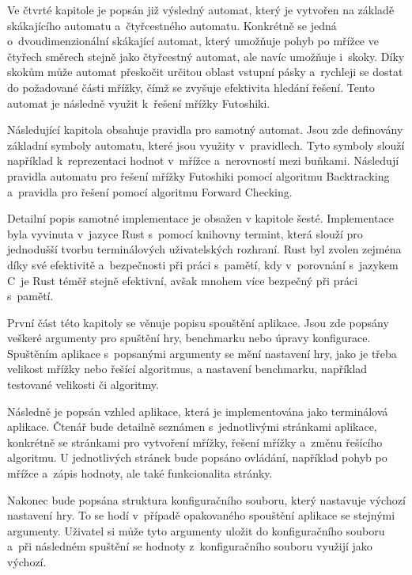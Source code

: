Ve čtvrté kapitole je popsán již výsledný automat, který je vytvořen na základě
skákajícího automatu a~čtyřcestného automatu. Konkrétně se jedná
o~dvoudimenzionální skákající automat, který umožňuje pohyb po mřížce ve
čtyřech směrech stejně jako čtyřcestný automat, ale navíc umožňuje i~skoky.
Díky skokům může automat přeskočit určitou oblast vstupní pásky a~rychleji se
dostat do požadované části mřížky, čímž se zvyšuje efektivita hledání řešení.
Tento automat je následně využit k~řešení mřížky Futoshiki.

Následující kapitola obsahuje pravidla pro samotný automat. Jsou zde definovány
základní symboly automatu, které jsou využity v~pravidlech. Tyto symboly slouží
například k~reprezentaci hodnot v~mřížce a~nerovností mezi buňkami. Následují
pravidla automatu pro řešení mřížky Futoshiki pomocí algoritmu Backtracking
a~pravidla pro řešení pomocí algoritmu Forward Checking.

Detailní popis samotné implementace je obsažen v kapitole šesté. Implementace
byla vyvinuta v~jazyce Rust s~pomocí knihovny termint, která slouží pro
jednodušší tvorbu terminálových uživatelských rozhraní. Rust byl zvolen zejména
díky své efektivitě a~bezpečnosti při práci s~pamětí, kdy v~porovnání s~jazykem
C~je Rust téměř stejně efektivní, avšak mnohem více bezpečný při práci
s~pamětí.

První část této kapitoly se věnuje popisu spouštění aplikace. Jsou zde popsány
veškeré argumenty pro spuštění hry, benchmarku nebo úpravy konfigurace.
Spuštěním aplikace s~popsanými argumenty se mění nastavení hry, jako je třeba
velikost mřížky nebo řešící algoritmus, a nastavení benchmarku, například
testované velikosti či algoritmy.

Následně je popsán vzhled aplikace, která je implementována jako terminálová
aplikace. Čtenář bude detailně seznámen s~jednotlivými stránkami aplikace,
konkrétně se stránkami pro vytvoření mřížky, řešení mřížky a~změnu řešícího
algoritmu. U jednotlivých stránek bude popsáno ovládání, například pohyb po
mřížce a~zápis hodnoty, ale také funkcionalita stránky.

Nakonec bude popsána struktura konfiguračního souboru, který nastavuje výchozí
nastavení hry. To se hodí v~případě opakovaného spouštění aplikace se stejnými
argumenty. Uživatel si může tyto argumenty uložit do konfiguračního souboru
a~při následném spuštění se hodnoty z~konfiguračního souboru využijí jako
výchozí.

